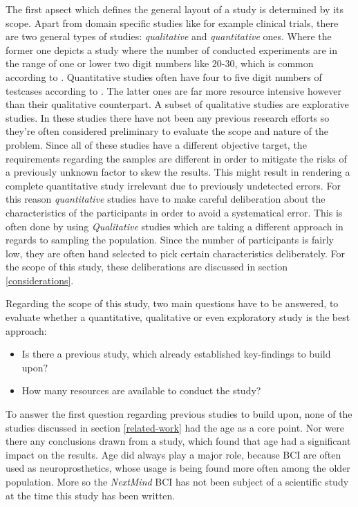             The first apsect which defines the general layout of a study is determined by its scope. Apart from domain specific studies like for example clinical trials, there are two general types of studies: \textit{qualitative} and \textit{quantitative} ones. Where the former one depicts a study where the number of conducted experiments are in the range of one or lower two digit numbers like 20-30, which is common according to \cite[302]{Doring.2016}. Quantitative studies often have four to five digit numbers of testcases according to \cite[305]{Doring.2016}. The latter ones are far more resource intensive however than their qualitative counterpart. A subset of qualitative studies are explorative studies. In these studies there have not been any previous research efforts so they're often considered preliminary to evaluate the scope and nature of the problem. Since all of these studies have a different objective target, the requirements regarding the samples are different in order to mitigate the risks of a previously unknown factor to skew the results. This might result in rendering a complete quantitative study irrelevant due to previously undetected errors. For this reason \textit{quantitative} studies have to make careful deliberation about the characteristics of the participants in order to avoid a systematical error. This is often done by using \textit{Qualitative} studies which are taking a different approach in regards to sampling the population. Since the number of participants is fairly low, they are often hand selected to pick certain characteristics deliberately. For the scope of this study, these deliberations are discussed in section \ref*{considerations}. 

            Regarding the scope of this study, two main questions have to be answered, to evaluate whether a quantitative, qualitative or even exploratory study is the best approach:

            \begin{itemize}
                \item Is there a previous study, which already established key-findings to build upon?
                \item How many resources are available to conduct the study?
            \end{itemize}

            To answer the first question regarding previous studies to build upon, none of the studies discussed in section \ref*{related-work} had the age as a core point. Nor were there any conclusions drawn from a study, which found that age had a significant impact on the results. Age did always play a major role, because BCI are often used as neuroprosthetics, whose usage is being found more often among the older population. More so the \textit{NextMind} BCI has not been subject of a scientific study at the time this study has been written.

